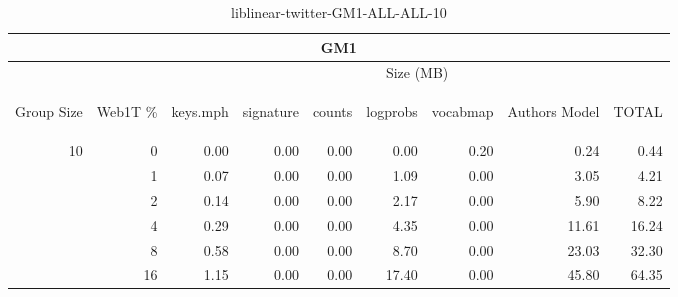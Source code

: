 \begin{center}
\begin{table}[htbp] 
 \begin{center}
\begin{tabular}{ | r | r | r | r | r | r | r | r | r |}
\hline
\multicolumn{9}{|c|}{GM1}\\
\hline
 & & \multicolumn{7}{|c|}{Size (MB)}\\ \cline{3-9}
\begin{sideways}Group Size\end{sideways} & \begin{sideways}Web1T \% \end{sideways} & \begin{sideways}keys.mph\end{sideways} & \begin{sideways}signature\end{sideways} & \begin{sideways}counts\end{sideways} & \begin{sideways}logprobs\end{sideways} & \begin{sideways}vocabmap\end{sideways} & \begin{sideways}Authors Model \end{sideways} & \begin{sideways}TOTAL\end{sideways}\\
\hline
\multirow{5}{*}{10}
 & 0 & 0.00 & 0.00 & 0.00 & 0.00 & 0.20 & 0.24 & 0.44\\ \cline{2-9}
 & 1 & 0.07 & 0.00 & 0.00 & 1.09 & 0.00 & 3.05 & 4.21\\ \cline{2-9}
 & 2 & 0.14 & 0.00 & 0.00 & 2.17 & 0.00 & 5.90 & 8.22\\ \cline{2-9}
 & 4 & 0.29 & 0.00 & 0.00 & 4.35 & 0.00 & 11.61 & 16.24\\ \cline{2-9}
 & 8 & 0.58 & 0.00 & 0.00 & 8.70 & 0.00 & 23.03 & 32.30\\ \cline{2-9}
 & 16 & 1.15 & 0.00 & 0.00 & 17.40 & 0.00 & 45.80 & 64.35\\ \cline{2-9}
\hline
\end{tabular}
\caption{liblinear-twitter-GM1-ALL-ALL-10}
\label{table:liblinear-twitter-GM1-ALL-ALL-10}
\end{center}
 \end{table}
\end{center}

